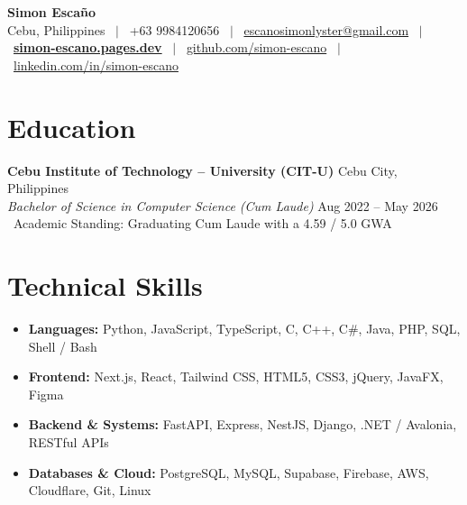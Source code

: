 \documentclass[10pt,letterpaper]{article}
\begin{document}
\begin{center}
  {\Huge \textbf{Simon Esca\~no}} \\[3pt]
  \small
  Cebu, Philippines \ $|$ \ 
  +63 9984120656 \ $|$ \ 
  \href{mailto:escanosimonlyster@gmail.com}{escanosimonlyster@gmail.com} \ $|$ \ 
  \href{https://simon-escano.pages.dev}{\textbf{simon-escano.pages.dev}} \ $|$ \ 
  \href{https://github.com/simon-escano}{github.com/simon-escano} \ $|$ \ 
  \href{https://www.linkedin.com/in/simon-escano/}{linkedin.com/in/simon-escano}
\end{center}
\vspace{-4pt}

\section{Education}
\textbf{Cebu Institute of Technology -- University (CIT-U)} \hfill Cebu City, Philippines \\
\textit{Bachelor of Science in Computer Science (Cum Laude)} \hfill Aug 2022 -- May 2026 \\
\textbullet\ Academic Standing: Graduating Cum Laude with a 4.59 / 5.0 GWA

\section{Technical Skills}
\begin{itemize}[leftmargin=*,label={}]
  \item \textbf{Languages:} Python, JavaScript, TypeScript, C, C++, C\#, Java, PHP, SQL, Shell / Bash
  \item \textbf{Frontend:} Next.js, React, Tailwind CSS, HTML5, CSS3, jQuery, JavaFX, Figma
  \item \textbf{Backend \& Systems:} FastAPI, Express, NestJS, Django, .NET / Avalonia, RESTful APIs
  \item \textbf{Databases \& Cloud:} PostgreSQL, MySQL, Supabase, Firebase, AWS, Cloudflare, Git, Linux
\end{itemize}

\end{document}
